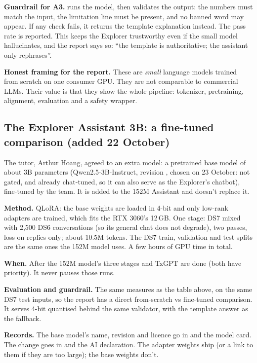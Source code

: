 \textbf{Guardrail for A3.}  runs the model, then validates the output:
the numbers must match the input, the limitation line must be present, and no banned word may
appear. If any check fails, it returns the template explanation instead. The pass rate is
reported. This keeps the Explorer trustworthy even if the small model hallucinates, and the
report says so: ``the template is authoritative; the assistant only rephrases''.

\textbf{Honest framing for the report.} These are \emph{small} language models trained from
scratch on one consumer GPU. They are not comparable to commercial LLMs. Their value is that
they show the whole pipeline: tokenizer, pretraining, alignment, evaluation and a safety wrapper.

\subsection{The Explorer Assistant 3B: a fine-tuned comparison (added 22 October)}
\label{sec:assistant3b}

The tutor, Arthur Hoang, agreed to an extra model: a pretrained base model of about 3B parameters
(Qwen2.5-3B-Instruct, revision , chosen on 23 October: not gated, and already chat-tuned, so it can also serve as the Explorer's chatbot), fine-tuned by the team. It is added
to the 152M Assistant and doesn't replace it.

\textbf{Method.} QLoRA: the base weights are loaded in 4-bit and only low-rank adapters are
trained, which fits the RTX 3060's 12\,GB. One stage: DS7 mixed with 2,500 DS6 conversations
(so its general chat does not degrade), two passes, loss on replies only; about 10.5M tokens. The DS7 train, validation and
test splits are the same ones the 152M model uses. A few hours of GPU time in total\est{}.

\textbf{When.} After the 152M model's three stages and TxGPT are done (both have priority).
It never pauses those runs.

\textbf{Evaluation and guardrail.} The same measures as the table above, on the same DS7 test
inputs, so the report has a direct from-scratch vs fine-tuned comparison. It serves 4-bit
quantised behind the same  validator, with the template answer as the
fallback.

\textbf{Records.} The base model's name, revision and licence go in  and the
model card. The change goes in  and the AI declaration. The adapter weights
ship (or a link to them if they are too large); the base weights don't.

